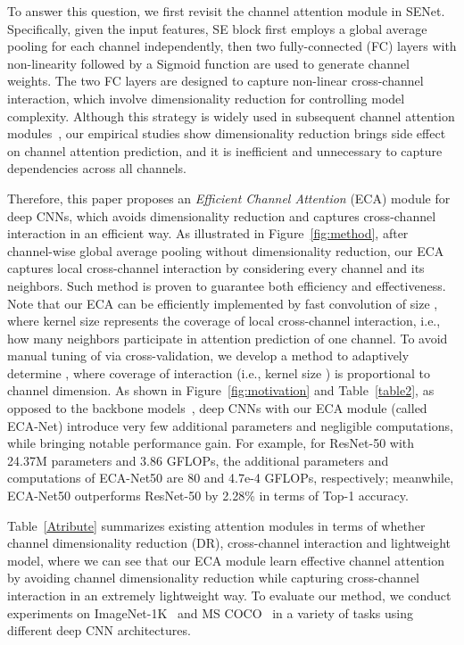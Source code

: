 \documentclass[10pt,twocolumn,letterpaper]{article}
\begin{document}
To answer this question, we first revisit the channel attention module in SENet. Specifically, given the input features, SE block first employs a global average pooling for each channel independently, then two fully-connected (FC) layers with non-linearity followed by a Sigmoid function are used to generate channel weights. The two FC layers are designed to capture non-linear cross-channel interaction, which involve dimensionality reduction for controlling model complexity. Although this strategy is widely used in subsequent channel attention modules~\cite{Woo_2018_ECCV,DBLP:conf/nips/HuSASV18,Gao_2019_CVPR}, our empirical studies show dimensionality reduction brings side effect on channel attention prediction, and it is inefficient and unnecessary to capture dependencies across all channels.   

Therefore, this paper proposes an \emph{Efficient Channel Attention} (ECA) module for deep CNNs, which avoids dimensionality reduction and captures cross-channel interaction in an efficient way. As illustrated in Figure~\ref{fig:method}, after channel-wise global average pooling without dimensionality reduction, our ECA captures local cross-channel interaction by considering every channel and its  neighbors. Such method is proven to guarantee both efficiency and effectiveness. Note that our ECA can be efficiently implemented by fast  convolution of size , where kernel size  represents the coverage of local cross-channel interaction, i.e., how many neighbors participate in attention prediction of one channel. To avoid manual tuning of  via cross-validation, we develop a method to adaptively determine , where  coverage of interaction (i.e., kernel size ) is proportional to channel dimension. As shown in Figure~\ref{fig:motivation} and Table~\ref{table2}, as opposed to the backbone models~\cite{He_2016_CVPR}, deep CNNs with our ECA module (called ECA-Net) introduce very few additional parameters and negligible computations, while bringing notable performance gain. For example, for ResNet-50 with 24.37M parameters and 3.86 GFLOPs, the additional parameters and computations of ECA-Net50  are 80 and 4.7e-4 GFLOPs, respectively; meanwhile, ECA-Net50 outperforms ResNet-50 by 2.28\%  in terms of Top-1 accuracy. 

Table~\ref{Atribute} summarizes existing attention modules in terms of whether channel dimensionality reduction (DR), cross-channel interaction and lightweight model, where we can see that our ECA module learn effective channel attention by avoiding channel dimensionality reduction while capturing cross-channel interaction in an extremely lightweight way. To evaluate our method, we conduct experiments on ImageNet-1K~\cite{imagenet_cvpr09} and MS COCO~\cite{lin2014microsoft} in a variety of tasks using different deep CNN architectures. 
\end{document}
